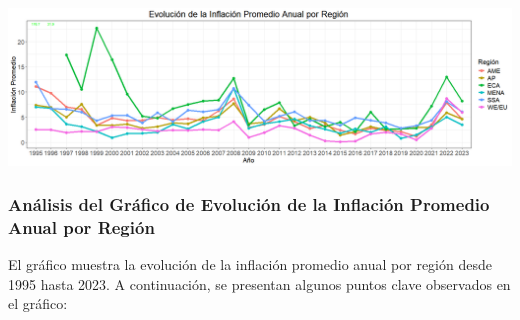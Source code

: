 \documentclass[
]{article}
\begin{document}
\includegraphics{Inflacion_Anual_Region.png}

\subsubsection{Análisis del Gráfico de Evolución de la Inflación
Promedio Anual por
Región}\label{analisis-del-grafico-de-evolucion-de-la-inflacion-promedio-anual-por-region}

El gráfico muestra la evolución de la inflación promedio anual por
región desde 1995 hasta 2023. A continuación, se presentan algunos
puntos clave observados en el gráfico:
\end{document}
